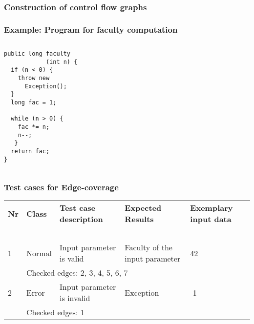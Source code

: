 
\begin{frame}
\frametitle{Construction of control flow graphs}
\begin{center}
\end{center}
\end{frame}


\begin{frame}[fragile]
\frametitle{Example: Program for faculty computation}
\begin{columns}
\begin{column}{0.4\textwidth}
\lstset{language=Java,basicstyle=\small}
\begin{lstlisting}
public long faculty
            (int n) {
  if (n < 0) {
    throw new 
      Exception();
  }
  long fac = 1;

  while (n > 0) {
    fac *= n;
    n--;
   }
  return fac;
}
\end{lstlisting}
\end{column}
\pause
\begin{column}{0.6\textwidth}
\begin{center}
\end{center}
\end{column}
\end{columns}
\end{frame}


\begin{frame}
\frametitle{Test cases for Edge-coverage}
\begin{tabular}{llp{}p{}p{}}
\textbf{Nr} & \textbf{Class} & \textbf{Test case description} & \textbf{Expected Results}  & \textbf{Exemplary input data} \\
~\\
1           & Normal          & Input parameter is valid	& Faculty of the input parameter	& 42 \\
            & \multicolumn{4}{l}{Checked edges: 2, 3, 4, 5, 6, 7} \\[2em]
2           & Error          & Input parameter is invalid   & Exception & -1 \\
            & \multicolumn{4}{l}{Checked edges: 1}
\end{tabular}
\end{frame}

